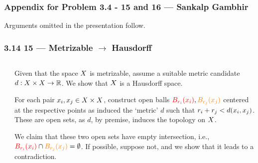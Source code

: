 \begin{frame}
    \frametitle{Appendix for Problem 3.4 - 15 and 16 --- Sankalp Gambhir}

    Arguments omitted in the presentation follow.

\end{frame}

\begin{frame}
    \frametitle{3.14 15 --- Metrizable \(\rightarrow\) Hausdorff}

    \begin{columns}
        \begin{column}{0.3\textwidth}
            \scalebox{0.7}{}            
        \end{column}
        \begin{column}{0.7\textwidth}
            Given that the space \(X\) is metrizable, assume a suitable
            metric candidate \(d: X \times X \to \mathbb{R}\). We show that
            \(X\) is a Hausdorff space.

            For each pair \(x_i, x_j \in X \times X\), construct open
            balls \(\textcolor{red}{B_{r_i}(x_i)},
            \textcolor{orange}{B_{r_j}(x_j)}\) centered at the respective points
            as induced the `metric' \(d\) such that \(r_i + r_j <
            d(x_i, x_j)\). These are open sets, as \(d\), by premise,
            induces the topology on \(X\).

            We claim that these two open sets have empty intersection, i.e.,
            \(\textcolor{red}{B_{r_i}(x_i)} \cap
            \textcolor{orange}{B_{r_j}(x_j)} = \emptyset\). If possible, suppose
            not, and we show that it leads to a contradiction. 
        \end{column}
    \end{columns}   

\end{frame}

